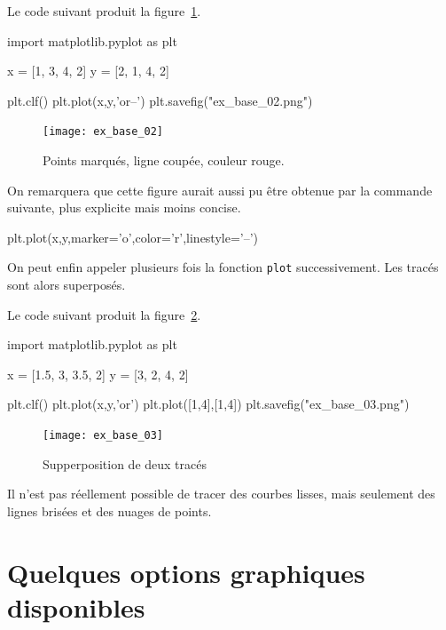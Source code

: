 \begin{ex}
  Le code suivant produit la figure~\ref{fig:ex_base_02}.
\begin{pyverbatim}
import matplotlib.pyplot as plt

x = [1, 3, 4, 2]
y = [2, 1, 4, 2]

plt.clf()
plt.plot(x,y,'or--')
plt.savefig("ex_base_02.png")
\end{pyverbatim}
\begin{figure}[!h]
  \begin{center}
    \texttt{[image: ex\_base\_02]}
    \caption{Points marqués, ligne coupée, couleur rouge.}
    \label{fig:ex_base_02}
  \end{center}
\end{figure}
On remarquera que cette figure aurait aussi pu être obtenue par la commande suivante, plus explicite mais moins concise. 
\begin{pyverbatim}
plt.plot(x,y,marker='o',color='r',linestyle='--')
\end{pyverbatim}
\end{ex}

On peut enfin appeler plusieurs fois la fonction \texttt{plot} successivement. Les tracés sont alors superposés. 
\begin{ex}
  Le code suivant produit la figure~\ref{fig:ex_base_03}.
\begin{pyverbatim}
import matplotlib.pyplot as plt

x = [1.5, 3, 3.5, 2]
y = [3, 2, 4, 2]

plt.clf()
plt.plot(x,y,'or')
plt.plot([1,4],[1,4])
plt.savefig("ex_base_03.png")
\end{pyverbatim}
\begin{figure}[!h]
  \begin{center}
    \texttt{[image: ex\_base\_03]}
    \caption{Supperposition de deux tracés}
    \label{fig:ex_base_03}
  \end{center}
\end{figure}
\end{ex}
\begin{rem}
  Il n'est pas réellement possible de tracer des courbes lisses, mais seulement des lignes brisées et des nuages de 
points. 
\end{rem}


\section{Quelques options graphiques disponibles}


